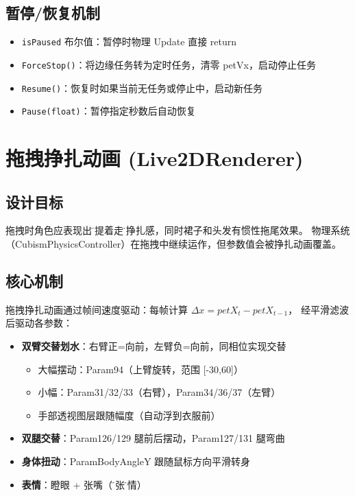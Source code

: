 \documentclass[12pt,a4paper]{ctexart}
\begin{document}
\subsection{暂停/恢复机制}

\begin{itemize}
    \item \texttt{isPaused} 布尔值：暂停时物理 Update 直接 return
    \item \texttt{ForceStop()}：将边缘任务转为定时任务，清零 petVx，启动停止任务
    \item \texttt{Resume()}：恢复时如果当前无任务或停止中，启动新任务
    \item \texttt{Pause(float)}：暂停指定秒数后自动恢复
\end{itemize}

\section{拖拽挣扎动画 (Live2DRenderer)}

\subsection{设计目标}

拖拽时角色应表现出\"被提着走\"的挣扎感，同时裙子和头发有惯性拖尾效果。
物理系统（CubismPhysicsController）在拖拽中继续运作，但参数值会被挣扎动画覆盖。

\subsection{核心机制}

拖拽挣扎动画通过帧间速度驱动：每帧计算 $\Delta x = petX_{t} - petX_{t-1}$，
经平滑滤波后驱动各参数：

\begin{itemize}
    \item \textbf{双臂交替划水}：右臂正=向前，左臂负=向前，同相位实现交替
        \begin{itemize}
            \item 大幅摆动：Param94（上臂旋转，范围 [-30,60]）
            \item 小幅：Param31/32/33（右臂），Param34/36/37（左臂）
            \item 手部透视图层跟随幅度（自动浮到衣服前）
        \end{itemize}
    \item \textbf{双腿交替}：Param126/129 腿前后摆动，Param127/131 腿弯曲
    \item \textbf{身体扭动}：ParamBodyAngleY 跟随鼠标方向平滑转身
    \item \textbf{表情}：瞪眼 + 张嘴（\"慌张\"表情）
\end{itemize}
\end{document}
